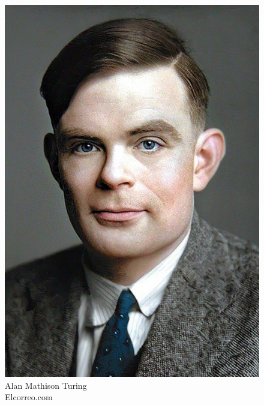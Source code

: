 \begin{frame}[t]
{\begin{minipage}[t]{\textwidth}
\begin{minipage}[t]{0.6\textwidth}
\begin{itemize}[leftmargin=10pt,align=right]
\begin{itemize}[leftmargin=10pt,align=right]
						\end{itemize}
					\end{itemize}
            	\end{minipage}
            	\begin{minipage}[t]{0.4\textwidth}
                	\centering
                	\begin{figure}[ht]
						\includegraphics[width=.6\textwidth]{img/alan-turing-color.png}
						{\tiny\\Alan Mathison Turing\\\textcopyright Elcorreo.com}
                	\end{figure}
            	\end{minipage}
	    	\end{minipage}
	}
\end{frame}
%
